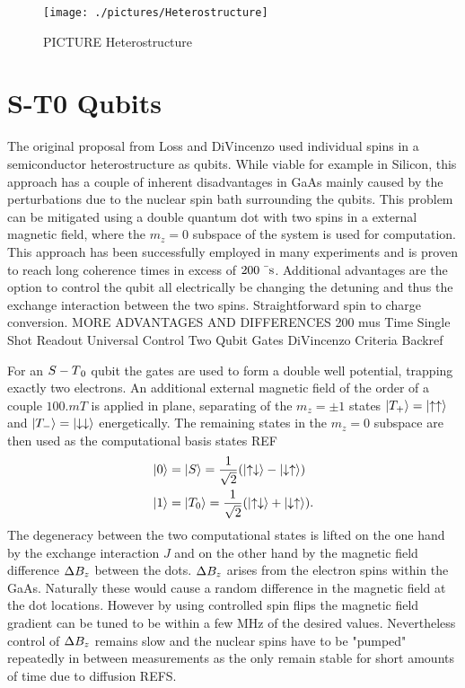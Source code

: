 \begin{figure}[htbp]\centering
     \centering
     \texttt{[image: ./pictures/Heterostructure]}
     \caption{PICTURE Heterostructure}
     \label{fig:bloch_sphere}
 \end{figure}
 

\section{S-T0 Qubits}
The original proposal from Loss and DiVincenzo used individual spins in a semiconductor heterostructure as qubits. While viable for example in Silicon, this approach has a couple of inherent disadvantages in GaAs mainly caused by the perturbations due to the nuclear spin bath surrounding the qubits.
This problem can be mitigated using a double quantum dot with two spins in a external magnetic field, where the $m_z=0$ subspace of the system is used for computation. This approach has been successfully employed in many experiments and is proven to reach long coherence times in excess of $200\;\mathrm{\mu s}$.
Additional advantages are the option to control the qubit all electrically be changing the detuning and thus the exchange interaction between the two spins.
Straightforward spin to charge conversion.
MORE ADVANTAGES AND DIFFERENCES
200 mus Time
Single Shot Readout
Universal Control
Two  Qubit Gates 
DiVincenzo Criteria Backref





For an $S-T\textsubscript{0}$ qubit the gates are used to form a double well potential, trapping exactly two electrons. An additional external magnetic field of the order of a couple $\si{100.mT}$ is applied in plane, separating of the $m_z=\pm1$ states $\ket{T_+}=\ket{\uparrow \uparrow}$ and $\ket{T_-}=\ket{\downarrow \downarrow}$ energetically. The remaining states in the $m_z=0$ subspace are then used as the computational basis states REF
\begin{align}
    \ket{0}&=\ket{S}=\frac{1}{\sqrt{2}}(\ket{\uparrow \downarrow}-\ket{\downarrow \uparrow}) \\
    \ket{1}&=\ket{T_0}=\frac{1}{\sqrt{2}}(\ket{\uparrow \downarrow}+\ket{\downarrow \uparrow}).
\end{align}
The degeneracy between the two computational states is lifted on the one hand by the exchange interaction $J$ and on the other hand by the magnetic field difference $\mathrm{\Delta}B_z$ between the dots.
$\mathrm{\Delta}B_z$ arises from the electron spins within the GaAs. Naturally these would cause a random difference in the magnetic field at the dot locations. However by using controlled spin flips the magnetic field gradient can be tuned to be within a few MHz of the desired values. Nevertheless control of $\mathrm{\Delta}B_z$ remains slow and the nuclear spins have to be "pumped" repeatedly in between measurements as the only remain stable for short amounts of time due to diffusion REFS.

